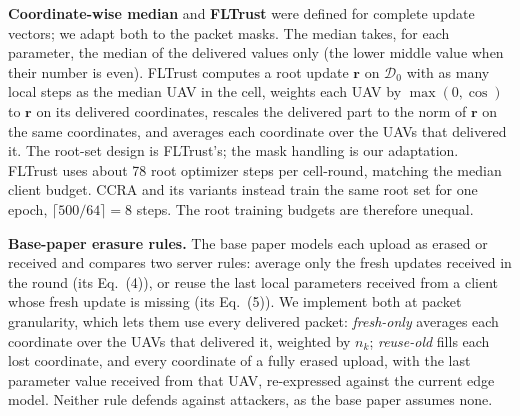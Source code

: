 \textbf{Coordinate-wise median} \cite{yin2018median} and \textbf{FLTrust}
\cite{cao2021fltrust} were defined for complete update vectors; we adapt both to the
packet masks. The median takes, for each parameter, the median of the delivered
values only (the lower middle value when their number is even). FLTrust computes a
root update $\mathbf{r}$ on $\mathcal{D}_0$ with as many local steps as the median
UAV in the cell, weights each UAV by $\max(0,\cos)$ to $\mathbf{r}$ on its delivered
coordinates, rescales the delivered part to the norm of $\mathbf{r}$ on the same
coordinates, and averages each coordinate over the UAVs that delivered it. The
root-set design is FLTrust's; the mask handling is our adaptation. FLTrust uses
about 78 root optimizer steps per cell-round, matching the median client budget.
CCRA and its variants instead train the same root set for one epoch,
$\lceil500/64\rceil=8$ steps. The root training budgets are therefore unequal.

\textbf{Base-paper erasure rules.} The base paper \cite{shirvanimoghaddam2022erroneous}
models each upload as erased or received and compares two server rules: average only
the fresh updates received in the round (its Eq.~(4)), or reuse the last local
parameters received from a client whose fresh update is missing (its Eq.~(5)). We
implement both at packet granularity, which lets them use every delivered packet:
\emph{fresh-only} averages each coordinate over the UAVs that delivered it, weighted by
$n_k$; \emph{reuse-old} fills each lost coordinate, and every coordinate of a fully
erased upload, with the last parameter value received from that UAV, re-expressed
against the current edge model. Neither rule defends against attackers, as the base
paper assumes none.

